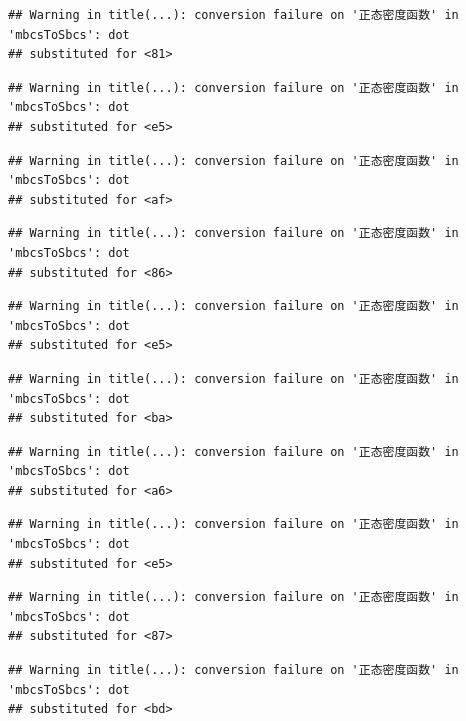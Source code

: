 \documentclass[
]{book}
\begin{document}
\begin{verbatim}
## Warning in title(...): conversion failure on '正态密度函数' in 'mbcsToSbcs': dot
## substituted for <81>
\end{verbatim}

\begin{verbatim}
## Warning in title(...): conversion failure on '正态密度函数' in 'mbcsToSbcs': dot
## substituted for <e5>
\end{verbatim}

\begin{verbatim}
## Warning in title(...): conversion failure on '正态密度函数' in 'mbcsToSbcs': dot
## substituted for <af>
\end{verbatim}

\begin{verbatim}
## Warning in title(...): conversion failure on '正态密度函数' in 'mbcsToSbcs': dot
## substituted for <86>
\end{verbatim}

\begin{verbatim}
## Warning in title(...): conversion failure on '正态密度函数' in 'mbcsToSbcs': dot
## substituted for <e5>
\end{verbatim}

\begin{verbatim}
## Warning in title(...): conversion failure on '正态密度函数' in 'mbcsToSbcs': dot
## substituted for <ba>
\end{verbatim}

\begin{verbatim}
## Warning in title(...): conversion failure on '正态密度函数' in 'mbcsToSbcs': dot
## substituted for <a6>
\end{verbatim}

\begin{verbatim}
## Warning in title(...): conversion failure on '正态密度函数' in 'mbcsToSbcs': dot
## substituted for <e5>
\end{verbatim}

\begin{verbatim}
## Warning in title(...): conversion failure on '正态密度函数' in 'mbcsToSbcs': dot
## substituted for <87>
\end{verbatim}

\begin{verbatim}
## Warning in title(...): conversion failure on '正态密度函数' in 'mbcsToSbcs': dot
## substituted for <bd>
\end{verbatim}
\end{document}
